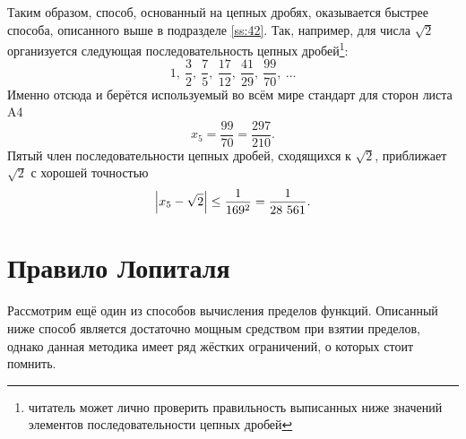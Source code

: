 \documentclass[12pt]{article}
\begin{document}
Таким образом, способ, основанный на цепных дробях, оказывается быстрее способа, описанного выше в подразделе \ref{ss:42}. Так, например, для числа $\sqrt{2}$ организуется следующая последовательность цепных дробей\footnote{читатель может лично проверить правильность выписанных ниже значений элементов последовательности цепных дробей}:
\begin{equation}
    1,\ \dfrac{3}{2},\ \dfrac{7}{5},\ \dfrac{17}{12},\ \dfrac{41}{29},\ \dfrac{99}{70},\ \ldots
\end{equation}
Именно отсюда и берётся используемый во всём мире стандарт для сторон листа A4
\begin{equation}
    x_5 = \dfrac{99}{70} = \dfrac{297}{210}.
\end{equation}
Пятый член последовательности цепных дробей, сходящихся к $\sqrt{2}$, приближает $\sqrt{2}$ с хорошей точностью
\begin{equation}
    \abs{x_5 - \sqrt{2}} \le \dfrac{1}{169^2} = \dfrac{1}{28\ 561}.
\end{equation}
\section{Правило Лопиталя}

Рассмотрим ещё один из способов вычисления пределов функций. Описанный ниже способ является достаточно мощным средством при взятии пределов, однако данная методика имеет ряд жёстких ограничений, о которых стоит помнить.
\end{document}
